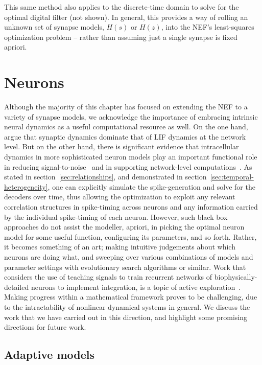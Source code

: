 This same method also applies to the discrete-time domain to solve for the optimal digital filter (not shown).
In general, this provides a way of rolling an unknown set of synapse models, $H(s)$ or $H(z)$, into the NEF's least-squares optimization problem -- rather than assuming just a single synapse is fixed apriori.


\section{Neurons}

Although the majority of this chapter has focused on extending the NEF to a variety of synapse models,
we acknowledge the importance of embracing intrinsic neural dynamics as a useful computational resource as well.
On the one hand, \citet[][appendix~F.1]{eliasmith2003a} argue that synaptic dynamics dominate that of LIF dynamics at the network level.
But on the other hand, there is significant evidence that intracellular dynamics in more sophisticated neuron models play an important functional role in reducing signal-to-noise~\citep[][chapter~4]{eliasmith2003a} and in supporting network-level computations~\citep{izhikevich2007dynamical}.
As stated in section~\ref{sec:relationships}, and demonstrated in section~\ref{sec:temporal-heterogeneity}, one can explicitly simulate the spike-generation and solve for the decoders over time, thus allowing the optimization to exploit any relevant correlation structures in spike-timing across neurons and any information carried by the individual spike-timing of each neuron.
However, such black box approaches do not assist the modeller, apriori, in picking the optimal neuron model for some useful function, configuring its parameters, and so forth.
Rather, it becomes something of an art; making intuitive judgements about which neurons are doing what, and sweeping over various combinations of models and parameter settings with evolutionary search algorithms or similar.
Work that considers the use of teaching signals to train recurrent networks of biophysically-detailed neurons to implement integration, is a topic of active exploration~\citep{duggins2017incorporating, duggins2017b}.
Making progress within a mathematical framework proves to be challenging, due to the intractability of nonlinear dynamical systems in general.
We discuss the work that we have carried out in this direction, and highlight some promising directions for future work.

\subsection{Adaptive models}
\label{sec:adaptive-neurons}

